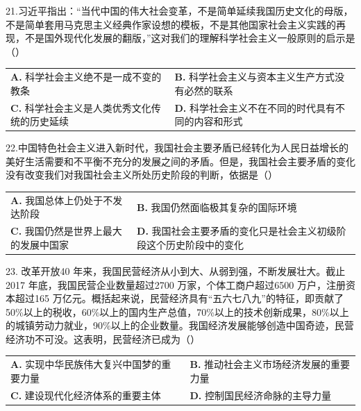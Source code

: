 \documentclass[UTF8,11pt]{ctexart}
\begin{document}
21.习近平指出：“当代中国的伟大社会变革，不是简单延续我国历史文化的母版，不是简单套用马克思主义经典作家设想的模板，不是其他国家社会主义实践的再现，不是国外现代化发展的翻版，”这对我们的理解科学社会主义一般原则的启示是（）


\begin{center}\begin{tabular}{>{\raggedright\arraybackslash}p{\dimexpr(\linewidth-4\tabcolsep)/2\relax}>{\raggedright\arraybackslash}p{\dimexpr(\linewidth-4\tabcolsep)/2\relax}}
\textbf{A.} 科学社会主义绝不是一成不变的教条 & \textbf{B.} 科学社会主义与资本主义生产方式没有必然的联系\\[.35em]
\textbf{C.} 科学社会主义是人类优秀文化传统的历史延续 & \textbf{D.} 科学社会主义不在不同的时代具有不同的内容和形式\\[.35em]\end{tabular}\end{center}

22.中国特色社会主义进入新时代，我国社会主要矛盾已经转化为人民日益增长的美好生活需要和不平衡不充分的发展之间的矛盾。但是，我国社会主要矛盾的变化没有改变我们对我国社会主义所处历史阶段的判断，依据是（）


\begin{center}\begin{tabular}{>{\raggedright\arraybackslash}p{\dimexpr(\linewidth-4\tabcolsep)/2\relax}>{\raggedright\arraybackslash}p{\dimexpr(\linewidth-4\tabcolsep)/2\relax}}
\textbf{A.} 我国总体上仍处于不发达阶段 & \textbf{B.} 我国仍然面临极其复杂的国际环境\\[.35em]
\textbf{C.} 我国仍然是世界上最大的发展中国家 & \textbf{D.} 我国社会主要矛盾的变化只是社会主义初级阶段这个历史阶段中的变化\\[.35em]\end{tabular}\end{center}

23. 改革开放40 年来，我国民营经济从小到大、从弱到强，不断发展壮大。截止2017 年底，我国民营企业数量超过2700 万家，个体工商户超过6500 万户，注册资本超过165 万亿元。概括起来说，民营经济具有“五六七八九”的特征，即贡献了50\%以上的税收，60\%以上的国内生产总值，70\%以上的技术创新成果，80\%以上的城镇劳动力就业，90\%以上的企业数量。我国经济发展能够创造中国奇迹，民营经济功不可没。这表明，民营经济已成为（）


\begin{center}\begin{tabular}{>{\raggedright\arraybackslash}p{\dimexpr(\linewidth-4\tabcolsep)/2\relax}>{\raggedright\arraybackslash}p{\dimexpr(\linewidth-4\tabcolsep)/2\relax}}
\textbf{A.} 实现中华民族伟大复兴中国梦的重要力量 & \textbf{B.} 推动社会主义市场经济发展的重要力量\\[.35em]
\textbf{C.} 建设现代化经济体系的重要主体 & \textbf{D.} 控制国民经济命脉的主导力量\\[.35em]\end{tabular}\end{center}
\end{document}

